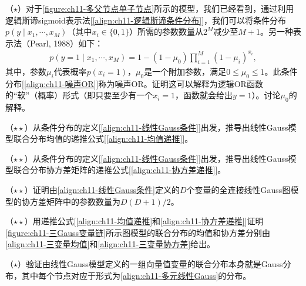 \documentclass[../../main.tex]{subfiles}
\begin{document}
\begin{exercise}\label{exercise:ch11-05}
（$\star$）对于\cref{figure:ch11-多父节点单子节点}所示的模型，我们已经看到，通过利用逻辑斯谛sigmoid表示法[\eqref{align:ch11-逻辑斯谛条件分布}]，我们可以将条件分布$p(y\mid x_1,\cdots,x_M)$（其中$x_i\in\{0,1\}$）所需的参数数量从$2^M$减少至$M+1$。另一种表示法（Pearl, 1988）如下：
\begin{align}
  p(y=1\mid x_1,\cdots,x_M) = 1-(1-\mu_0)\prod_{i=1}^{M}(1-\mu_i)^{x_i},
  \label{align:ch11-噪声OR}
\end{align}
其中，参数$\mu_i$代表概率$p(x_i=1)$，$\mu_0$是一个附加参数，满足$0\leqslant\mu_0\leqslant1$。此条件分布[\eqref{align:ch11-噪声OR}]称为噪声OR。证明这可以解释为逻辑OR函数的“软”（概率）形式（即只要至少有一个$x_i=1$，函数就会给出$y=1$）。讨论$\mu_0$的解释。
\end{exercise}

\begin{exercise}\label{exercise:ch11-06}
（$\star\star$）从条件分布的定义[\eqref{align:ch11-线性Gauss条件}]出发，推导出线性Gauss模型联合分布均值的递推公式[\eqref{align:ch11-均值递推}]。
\end{exercise}

\begin{exercise}\label{exercise:ch11-07}
（$\star\star$）从条件分布的定义[\eqref{align:ch11-线性Gauss条件}]出发，推导出线性Gauss模型联合分布协方差矩阵的递推公式[\eqref{align:ch11-协方差递推}]。
\end{exercise}

\begin{exercise}\label{exercise:ch11-08}
（$\star\star$）证明由\eqref{align:ch11-线性Gauss条件}定义的$D$个变量的全连接线性Gauss图模型的协方差矩阵中的参数数量为$D(D+1)/2$。
\end{exercise}

\begin{exercise}\label{exercise:ch11-09}
（$\star\star$）用递推公式[\eqref{align:ch11-均值递推}和\eqref{align:ch11-协方差递推}]证明\cref{figure:ch11-三Gauss变量链}所示图模型的联合分布的均值和协方差分别由\eqref{align:ch11-三变量均值}和\eqref{align:ch11-三变量协方差}给出。
\end{exercise}

\begin{exercise}\label{exercise:ch11-10}
（$\star$）验证由线性Gauss模型定义的一组向量值变量的联合分布本身就是Gauss分布，其中每个节点对应于形式为\eqref{align:ch11-多元线性Gauss}的分布。
\end{exercise}
\end{document}
